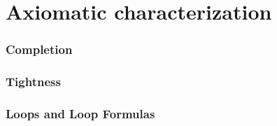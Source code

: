 \part{Axiomatic characterization}

\section{Completion}

\section{Tightness}

\section{Loops and Loop Formulas}

%
